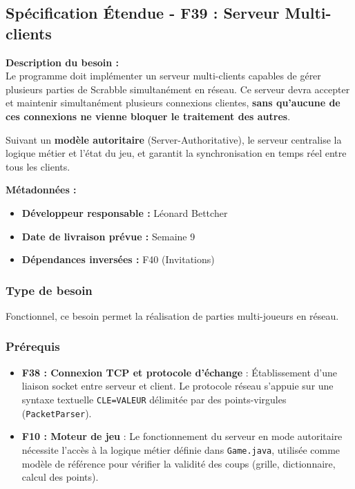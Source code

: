 \documentclass[a4paper]{article}
\begin{document}

\subsection{Spécification Étendue - F39 : Serveur Multi-clients}

\begin{besoinbox}
    \textbf{\large Description du besoin :} \\
    
    Le programme doit implémenter un serveur multi-clients capables de gérer plusieurs parties de Scrabble simultanément en réseau. Ce serveur devra accepter et maintenir simultanément plusieurs connexions clientes, \textbf{sans qu'aucune de ces connexions ne vienne bloquer le traitement des autres}. 
    
    Suivant un \textbf{modèle autoritaire} (Server-Authoritative), le serveur centralise la logique métier et l'état du jeu, et garantit la synchronisation en temps réel entre tous les clients.
    
    \vspace{3mm}
    \textbf{Métadonnées :}
    \begin{itemize}
        \item \textbf{Développeur responsable :} Léonard Bettcher
        \item \textbf{Date de livraison prévue :} Semaine 9
        \item \textbf{Dépendances inversées :} F40 (Invitations)
    \end{itemize}
\end{besoinbox}

\subsubsection{Type de besoin}
Fonctionnel, ce besoin permet la réalisation de parties multi-joueurs en réseau.

\subsubsection{Prérequis}
\begin{itemize}
    \item \textbf{F38 : Connexion TCP et protocole d'échange} : Établissement d'une liaison socket entre serveur et client. Le protocole réseau s'appuie sur une syntaxe textuelle \texttt{CLE=VALEUR} délimitée par des points-virgules (\texttt{PacketParser}).
    \item \textbf{F10 : Moteur de jeu} : Le fonctionnement du serveur en mode autoritaire nécessite l'accès à la logique métier définie dans \texttt{Game.java}, utilisée comme modèle de référence pour vérifier la validité des coups (grille, dictionnaire, calcul des points).
\end{itemize}
\end{document}
